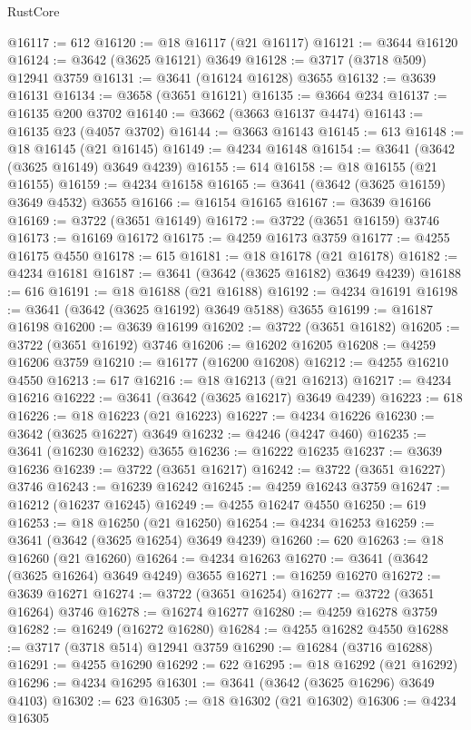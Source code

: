 \begin{lexlean}{RustCore}
\begin{coremodule}
@16117 := 612
@16120 := @18 @16117 (@21 @16117)
@16121 := @3644 @16120
@16124 := @3642 (@3625 @16121) @3649
@16128 := @3717 (@3718 @509) @12941 @3759
@16131 := @3641 (@16124 @16128) @3655
@16132 := @3639 @16131
@16134 := @3658 (@3651 @16121)
@16135 := @3664 @234
@16137 := @16135 @200 @3702
@16140 := @3662 (@3663 @16137 @4474)
@16143 := @16135 @23 (@4057 @3702)
@16144 := @3663 @16143
@16145 := 613
@16148 := @18 @16145 (@21 @16145)
@16149 := @4234 @16148
@16154 := @3641 (@3642 (@3625 @16149) @3649 @4239)
@16155 := 614
@16158 := @18 @16155 (@21 @16155)
@16159 := @4234 @16158
@16165 := @3641 (@3642 (@3625 @16159) @3649 @4532) @3655
@16166 := @16154 @16165
@16167 := @3639 @16166
@16169 := @3722 (@3651 @16149)
@16172 := @3722 (@3651 @16159) @3746
@16173 := @16169 @16172
@16175 := @4259 @16173 @3759
@16177 := @4255 @16175 @4550
@16178 := 615
@16181 := @18 @16178 (@21 @16178)
@16182 := @4234 @16181
@16187 := @3641 (@3642 (@3625 @16182) @3649 @4239)
@16188 := 616
@16191 := @18 @16188 (@21 @16188)
@16192 := @4234 @16191
@16198 := @3641 (@3642 (@3625 @16192) @3649 @5188) @3655
@16199 := @16187 @16198
@16200 := @3639 @16199
@16202 := @3722 (@3651 @16182)
@16205 := @3722 (@3651 @16192) @3746
@16206 := @16202 @16205
@16208 := @4259 @16206 @3759
@16210 := @16177 (@16200 @16208)
@16212 := @4255 @16210 @4550
@16213 := 617
@16216 := @18 @16213 (@21 @16213)
@16217 := @4234 @16216
@16222 := @3641 (@3642 (@3625 @16217) @3649 @4239)
@16223 := 618
@16226 := @18 @16223 (@21 @16223)
@16227 := @4234 @16226
@16230 := @3642 (@3625 @16227) @3649
@16232 := @4246 (@4247 @460)
@16235 := @3641 (@16230 @16232) @3655
@16236 := @16222 @16235
@16237 := @3639 @16236
@16239 := @3722 (@3651 @16217)
@16242 := @3722 (@3651 @16227) @3746
@16243 := @16239 @16242
@16245 := @4259 @16243 @3759
@16247 := @16212 (@16237 @16245)
@16249 := @4255 @16247 @4550
@16250 := 619
@16253 := @18 @16250 (@21 @16250)
@16254 := @4234 @16253
@16259 := @3641 (@3642 (@3625 @16254) @3649 @4239)
@16260 := 620
@16263 := @18 @16260 (@21 @16260)
@16264 := @4234 @16263
@16270 := @3641 (@3642 (@3625 @16264) @3649 @4249) @3655
@16271 := @16259 @16270
@16272 := @3639 @16271
@16274 := @3722 (@3651 @16254)
@16277 := @3722 (@3651 @16264) @3746
@16278 := @16274 @16277
@16280 := @4259 @16278 @3759
@16282 := @16249 (@16272 @16280)
@16284 := @4255 @16282 @4550
@16288 := @3717 (@3718 @514) @12941 @3759
@16290 := @16284 (@3716 @16288)
@16291 := @4255 @16290
@16292 := 622
@16295 := @18 @16292 (@21 @16292)
@16296 := @4234 @16295
@16301 := @3641 (@3642 (@3625 @16296) @3649 @4103)
@16302 := 623
@16305 := @18 @16302 (@21 @16302)
@16306 := @4234 @16305

\end{coremodule}
\end{lexlean}
